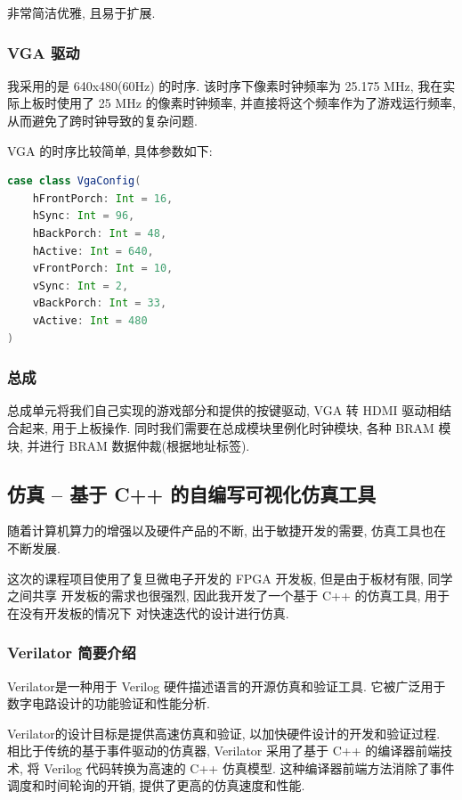 非常简洁优雅, 且易于扩展. 

\subsubsection{VGA 驱动}

我采用的是 640x480(60Hz) 的时序. 该时序下像素时钟频率为 25.175 MHz, 我在实际上板时使用了
25 MHz 的像素时钟频率, 并直接将这个频率作为了游戏运行频率, 从而避免了跨时钟导致的复杂问题. 

VGA 的时序比较简单, 具体参数如下: 

\begin{lstlisting}[language=scala]
case class VgaConfig(
    hFrontPorch: Int = 16,
    hSync: Int = 96,
    hBackPorch: Int = 48,
    hActive: Int = 640,
    vFrontPorch: Int = 10,
    vSync: Int = 2,
    vBackPorch: Int = 33,
    vActive: Int = 480
)
\end{lstlisting}

\subsubsection{总成}

总成单元将我们自己实现的游戏部分和提供的按键驱动, VGA 转 HDMI 驱动相结合起来, 
用于上板操作. 同时我们需要在总成模块里例化时钟模块, 各种 BRAM 模块, 并进行 BRAM 
数据仲裁(根据地址标签). 

\subsection{仿真 -- 基于 C++ 的自编写可视化仿真工具}

随着计算机算力的增强以及硬件产品的不断, 出于敏捷开发的需要, 仿真工具也在不断发展.

这次的课程项目使用了复旦微电子开发的 FPGA 开发板, 但是由于板材有限, 同学之间共享
开发板的需求也很强烈, 因此我开发了一个基于 C++ 的仿真工具, 用于在没有开发板的情况下
对快速迭代的设计进行仿真.

\subsubsection{Verilator 简要介绍}

Verilator是一种用于 Verilog 硬件描述语言的开源仿真和验证工具. 它被广泛用于数字电路设计的功能验证和性能分析. 

Verilator的设计目标是提供高速仿真和验证, 以加快硬件设计的开发和验证过程. 相比于传统的基于事件驱动的仿真器, Verilator 采用了基于 C++ 的编译器前端技术, 将 Verilog 代码转换为高速的 C++ 仿真模型. 这种编译器前端方法消除了事件调度和时间轮询的开销, 提供了更高的仿真速度和性能. 

